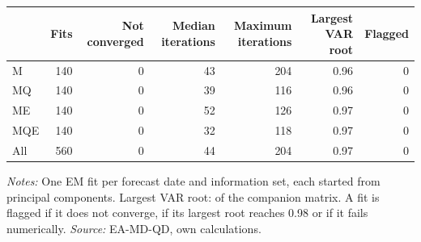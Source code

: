 \begin{threeparttable}
\begin{tabular}{lrrrrrr}
\toprule
 & Fits & Not converged & Median iterations & Maximum iterations & Largest VAR root & Flagged \\
\midrule
M & 140 & 0 & 43 & 204 & 0.96 & 0 \\
MQ & 140 & 0 & 39 & 116 & 0.96 & 0 \\
ME & 140 & 0 & 52 & 126 & 0.97 & 0 \\
MQE & 140 & 0 & 32 & 118 & 0.97 & 0 \\
All & 560 & 0 & 44 & 204 & 0.97 & 0 \\
\bottomrule
\end{tabular}
\begin{tablenotes}[flushleft]\footnotesize
\item \textit{Notes:} One EM fit per forecast date and information set, each started from principal components. Largest VAR root: of the companion matrix. A fit is flagged if it does not converge, if its largest root reaches 0.98 or if it fails numerically. \textit{Source:} EA-MD-QD, own calculations.
\end{tablenotes}
\end{threeparttable}

